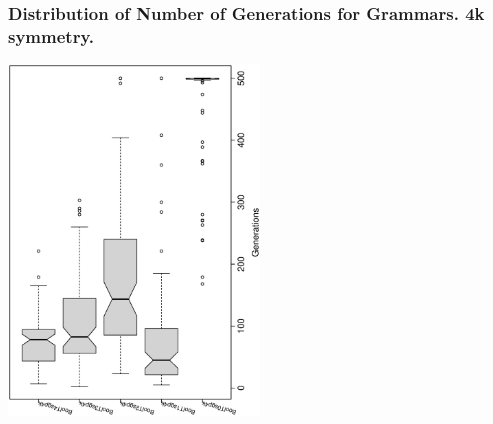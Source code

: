  \begin{frame}
 \frametitle{ Distribution of Number of Generations for Grammars. 4k  symmetry. }
 \begin{center}
\includegraphics[width=0.5\textwidth, angle=-90]
{ExpBboxplottGenerations002.eps}
 \end{center}
 \label{ExpBboxplottGenerations002.eps}  
 \end{frame}


